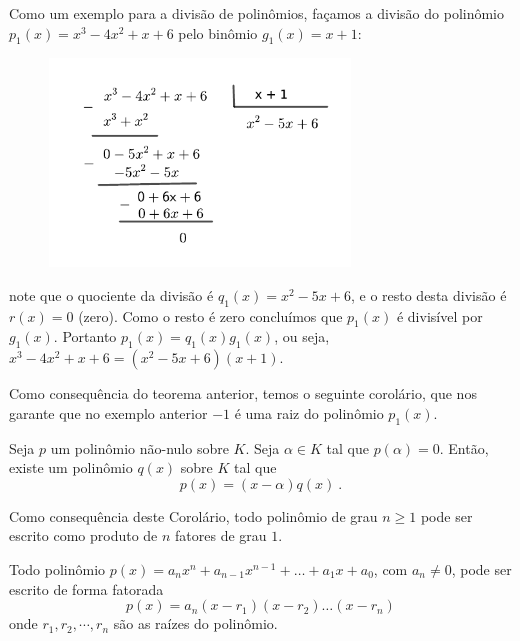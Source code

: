  
 \begin{exem}
  Como um exemplo para a divisão de polinômios, façamos a divisão do polinômio $p_1(x)=x^3-4x^2+x+6$ pelo binômio $g_1(x)=x+1$:

 \begin{figure}[H]
 \centering
 \includegraphics[width=8cm]{../Topicos/Figuras/polinomiosdivisao.pdf}
 \end{figure}
 
 note que o quociente da divisão é $q_1(x)= x^2 - 5x + 6$, e o resto desta divisão é $r(x)=0$ (zero). Como o resto é zero concluímos que $p_1(x)$ é divisível por $g_1(x)$. Portanto $p_1(x)= q_1(x)g_1(x)$, ou seja, $x^3-4x^2+x+6= (x^2-5x+6)(x+1)$.
 \end{exem}
 
 Como consequência do teorema anterior, temos o seguinte corolário, que nos garante que no exemplo anterior $-1$ é uma raiz do polinômio $p_1(x)$.
 
 \begin{cor}
 Seja $p$ um polinômio não-nulo sobre $K$. Seja $\alpha \in K$ tal que $p(\alpha)=0$. Então, existe um polinômio $q(x)$ sobre $K$ tal que 
 \[p(x)= (x - \alpha)q(x) \ .\]
 \end{cor}
 
 Como consequência deste Corolário, todo polinômio de grau $n \geq 1$ pode ser escrito como produto de $n$ fatores de grau $1$.
 
 \begin{teo}
  Todo polinômio $p(x)= a_nx^n + a_{n-1}x^{n-1}+ \ldots + a_1x+ a_0$, com $a_n \neq 0$, pode ser escrito de forma fatorada
  \[p(x)= a_n(x - r_1)(x - r_2) \ldots (x - r_n)\]
  onde $r_1, r_2, \cdots, r_n$ são as raízes do polinômio.  
 \end{teo}


